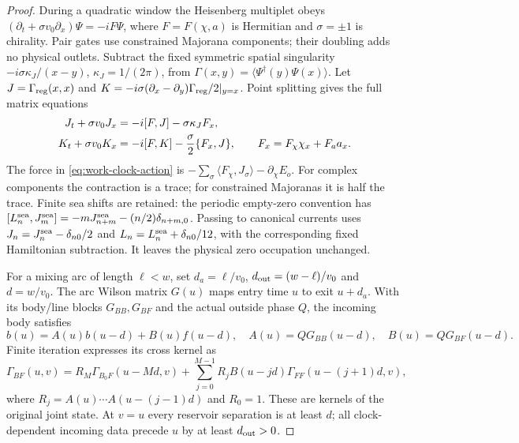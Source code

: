 \begin{proof}
During a quadratic window the Heisenberg multiplet obeys
$(\partial_t+\sigma v_0\partial_x)\Psi=-iF\Psi$, where
$F=F(\chi,a)$ is Hermitian and $\sigma=\pm1$ is chirality.
Pair gates use constrained Majorana components; their doubling adds
no physical outlets. Subtract the fixed symmetric spatial singularity
$-i\sigma\kappa_J/(x-y)$, $\kappa_J=1/(2\pi)$, from
$\Gamma(x,y)=\langle\Psi^\dagger(y)\Psi(x)\rangle$.
Let $J=\Gamma_{\rm reg}(x,x)$ and
$K=-i\sigma(\partial_x-\partial_y)\Gamma_{\rm reg}/2|_{y=x}$.
Point splitting gives the full matrix equations
\begin{align}
 J_t+\sigma v_0J_x&=-i[F,J]-\sigma\kappa_JF_x,\notag\\
 K_t+\sigma v_0K_x&=-i[F,K]-\frac\sigma2\{F_x,J\},
 \qquad F_x=F_\chi\chi_x+F_a a_x.
 \label{eq:matrix-clock-ward}
\end{align}
The force in \eqref{eq:work-clock-action} is
$-\sum_\sigma\langle F_\chi,J_\sigma\rangle-\partial_\chi E_o$.
For complex components the contraction is a trace; for constrained
Majoranas it is half the trace. Finite sea shifts are retained:
the periodic empty-zero convention has
$[L_n^{\rm sea},J_m^{\rm sea}]=-mJ_{n+m}^{\rm sea}
-(n/2)\delta_{n+m,0}$. Passing to canonical currents uses
$J_n=J_n^{\rm sea}-\delta_{n0}/2$ and
$L_n=L_n^{\rm sea}+\delta_{n0}/12$, with the corresponding
fixed Hamiltonian subtraction. It leaves the physical zero
occupation unchanged.

For a mixing arc of length $\ell<w$, set
$d_a=\ell/v_0$, $d_{\rm out}=(w-\ell)/v_0$ and $d=w/v_0$.
The arc Wilson matrix $G(u)$ maps entry time $u$ to exit
$u+d_a$. With its body/line blocks $G_{BB},G_{BF}$ and the actual
outside phase $Q$, the incoming body satisfies
\begin{equation}
 b(u)=A(u)b(u-d)+B(u)f(u-d),\quad
 A(u)=QG_{BB}(u-d),\quad B(u)=QG_{BF}(u-d).
 \label{eq:actual-delayed-clock-boundary}
\end{equation}
Finite iteration expresses its cross kernel as
\[
 \Gamma_{BF}(u,v)=R_M\Gamma_{B_0F}(u-Md,v)
 +\sum_{j=0}^{M-1}R_jB(u-jd)
                     \Gamma_{FF}(u-(j+1)d,v),
\]
where $R_j=A(u)\cdots A(u-(j-1)d)$ and $R_0=1$.
These are kernels of the original joint state. At $v=u$ every
reservoir separation is at least $d$; all clock-dependent incoming
data precede $u$ by at least $d_{\rm out}>0$.


\end{proof}
